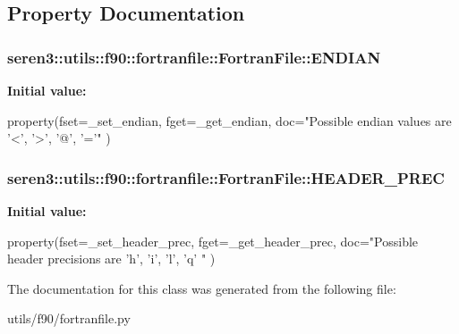 \subsection{Property Documentation}
\hypertarget{classseren3_1_1utils_1_1f90_1_1fortranfile_1_1FortranFile_a3be034482c2e575ba4a52c84b043211c}{
\subsubsection[{ENDIAN}]{\setlength{\rightskip}{0pt plus 5cm}seren3::utils::f90::fortranfile::FortranFile::ENDIAN}}
\label{classseren3_1_1utils_1_1f90_1_1fortranfile_1_1FortranFile_a3be034482c2e575ba4a52c84b043211c}
{\bfseries Initial value:}
\begin{DoxyCode}
property(fset=_set_endian,
                      fget=_get_endian,
                      doc="Possible endian values are '<', '>', '@', '='"
                     )
\end{DoxyCode}
\hypertarget{classseren3_1_1utils_1_1f90_1_1fortranfile_1_1FortranFile_ac2d863bd48f988fd44a0354c4b539fc3}{
\subsubsection[{HEADER\_\-PREC}]{\setlength{\rightskip}{0pt plus 5cm}seren3::utils::f90::fortranfile::FortranFile::HEADER\_\-PREC}}
\label{classseren3_1_1utils_1_1f90_1_1fortranfile_1_1FortranFile_ac2d863bd48f988fd44a0354c4b539fc3}
{\bfseries Initial value:}
\begin{DoxyCode}
property(fset=_set_header_prec,
                           fget=_get_header_prec,
                           doc="Possible header precisions are 'h', 'i', 'l', 'q'
      "
                          )
\end{DoxyCode}


The documentation for this class was generated from the following file:\begin{DoxyCompactItemize}
\item 
utils/f90/fortranfile.py\end{DoxyCompactItemize}
